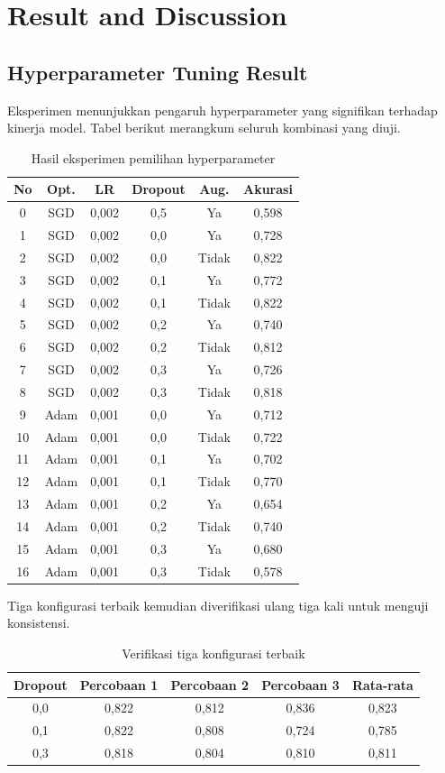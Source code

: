 \documentclass[10pt,a4paper]{jurnalvarian}
\let\LaTeXsection\section
\let\LaTeXsubsection\subsection
\def\section{\setlength{\leftskip}{0cm}\LaTeXsection}
\def\subsection{\setlength{\leftskip}{0.6cm}\LaTeXsubsection}
\begin{document}
\section{Result and Discussion}
\subsection{Hyperparameter Tuning Result}
Eksperimen menunjukkan pengaruh hyperparameter yang signifikan terhadap kinerja model. Tabel berikut merangkum seluruh kombinasi yang diuji.

\begin{table}[H]
\centering
\fontsize{8pt}{10pt}\selectfont
\caption{Hasil eksperimen pemilihan hyperparameter}
\begin{tabular}{cccccc}
\hline
No & Opt. & LR & Dropout & Aug. & Akurasi \\
\hline
0 & SGD & 0,002 & 0,5 & Ya & 0,598 \\
1 & SGD & 0,002 & 0,0 & Ya & 0,728 \\
2 & SGD & 0,002 & 0,0 & Tidak & 0,822 \\
3 & SGD & 0,002 & 0,1 & Ya & 0,772 \\
4 & SGD & 0,002 & 0,1 & Tidak & 0,822 \\
5 & SGD & 0,002 & 0,2 & Ya & 0,740 \\
6 & SGD & 0,002 & 0,2 & Tidak & 0,812 \\
7 & SGD & 0,002 & 0,3 & Ya & 0,726 \\
8 & SGD & 0,002 & 0,3 & Tidak & 0,818 \\
9 & Adam & 0,001 & 0,0 & Ya & 0,712 \\
10 & Adam & 0,001 & 0,0 & Tidak & 0,722 \\
11 & Adam & 0,001 & 0,1 & Ya & 0,702 \\
12 & Adam & 0,001 & 0,1 & Tidak & 0,770 \\
13 & Adam & 0,001 & 0,2 & Ya & 0,654 \\
14 & Adam & 0,001 & 0,2 & Tidak & 0,740 \\
15 & Adam & 0,001 & 0,3 & Ya & 0,680 \\
16 & Adam & 0,001 & 0,3 & Tidak & 0,578 \\
\hline
\end{tabular}
\end{table}

Tiga konfigurasi terbaik kemudian diverifikasi ulang tiga kali untuk menguji konsistensi.

\begin{table}[H]
\centering
\fontsize{8pt}{10pt}\selectfont
\caption{Verifikasi tiga konfigurasi terbaik}
\begin{tabular}{ccccc}
\hline
Dropout & Percobaan 1 & Percobaan 2 & Percobaan 3 & Rata-rata \\
\hline
0,0 & 0,822 & 0,812 & 0,836 & 0,823 \\
0,1 & 0,822 & 0,808 & 0,724 & 0,785 \\
0,3 & 0,818 & 0,804 & 0,810 & 0,811 \\
\hline
\end{tabular}
\end{table}
\end{document}
